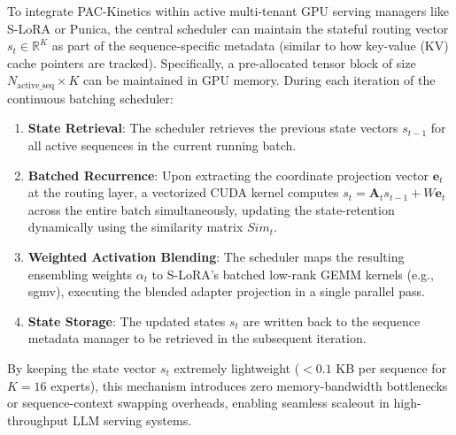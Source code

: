 To integrate \textsf{PAC-Kinetics} within active multi-tenant GPU serving managers like S-LoRA or Punica, the central scheduler can maintain the stateful routing vector $s_t \in \mathbb{R}^K$ as part of the sequence-specific metadata (similar to how key-value (KV) cache pointers are tracked). Specifically, a pre-allocated tensor block of size $N_{\text{active\_seq}} \times K$ can be maintained in GPU memory. During each iteration of the continuous batching scheduler:
\begin{enumerate}
    \item \textbf{State Retrieval}: The scheduler retrieves the previous state vectors $s_{t-1}$ for all active sequences in the current running batch.
    \item \textbf{Batched Recurrence}: Upon extracting the coordinate projection vector $\mathbf{e}_t$ at the routing layer, a vectorized CUDA kernel computes $s_t = \mathbf{A}_t s_{t-1} + W \mathbf{e}_t$ across the entire batch simultaneously, updating the state-retention dynamically using the similarity matrix $Sim_t$.
    \item \textbf{Weighted Activation Blending}: The scheduler maps the resulting ensembling weights $\alpha_t$ to S-LoRA's batched low-rank GEMM kernels (e.g., \textsf{sgmv}), executing the blended adapter projection in a single parallel pass.
    \item \textbf{State Storage}: The updated states $s_t$ are written back to the sequence metadata manager to be retrieved in the subsequent iteration.
\end{enumerate}
By keeping the state vector $s_t$ extremely lightweight ($<0.1$ KB per sequence for $K=16$ experts), this mechanism introduces zero memory-bandwidth bottlenecks or sequence-context swapping overheads, enabling seamless scaleout in high-throughput LLM serving systems.

